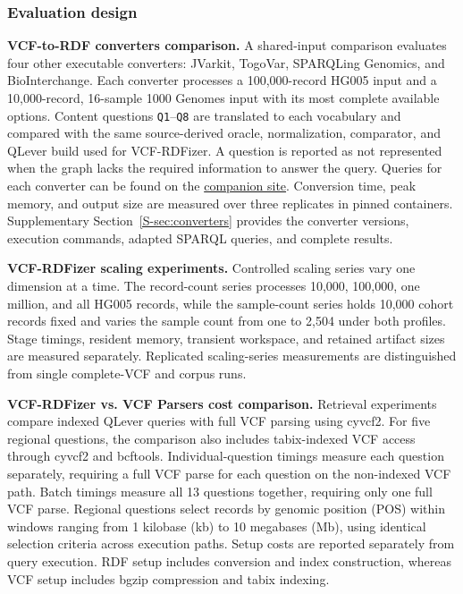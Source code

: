 \documentclass[pdflatex,sn-mathphys-num]{sn-jnl}
\begin{document}
\subsubsection{Evaluation design}\label{subsec:eval-scalability}
\textbf{VCF-to-RDF converters comparison.}
A shared-input comparison evaluates four other executable converters: JVarkit, TogoVar, SPARQLing Genomics, and BioInterchange.
Each converter processes a 100,000-record HG005 input and a 10,000-record, 16-sample 1000 Genomes input with its most complete available options.
Content questions \texttt{Q1}--\texttt{Q8} are translated to each vocabulary and compared with the same source-derived oracle, normalization, comparator, and QLever build used for VCF-RDFizer.
A question is reported as not represented when the graph lacks the required information to answer the query.
Queries for each converter can be found on the \href{https://ecrum19.github.io/vcf-rdfizer-testing/#rq3-queries}{companion site}.
Conversion time, peak memory, and output size are measured over three replicates in pinned containers.
Supplementary Section~\ref{S-sec:converters} provides the converter versions, execution commands, adapted SPARQL queries, and complete results.

\textbf{VCF-RDFizer scaling experiments.}
Controlled scaling series vary one dimension at a time.
The record-count series processes 10,000, 100,000, one million, and all HG005 records, while the sample-count series holds 10,000 cohort records fixed and varies the sample count from one to 2,504 under both profiles.
Stage timings, resident memory, transient workspace, and retained artifact sizes are measured separately.
Replicated scaling-series measurements are distinguished from single complete-VCF and corpus runs.

\textbf{VCF-RDFizer vs. VCF Parsers cost comparison.}
Retrieval experiments compare indexed QLever queries with full VCF parsing using cyvcf2.
For five regional questions, the comparison also includes tabix-indexed VCF access through cyvcf2 and bcftools.
Individual-question timings measure each question separately, requiring a full VCF parse for each question on the non-indexed VCF path.
Batch timings measure all 13 questions together, requiring only one full VCF parse.
Regional questions select records by genomic position (POS) within windows ranging from 1 kilobase (kb) to 10 megabases (Mb), using identical selection criteria across execution paths.
Setup costs are reported separately from query execution.
RDF setup includes conversion and index construction, whereas VCF setup includes bgzip compression and tabix indexing.
\end{document}
